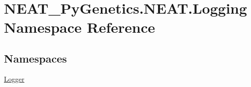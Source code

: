\hypertarget{namespaceNEAT__PyGenetics_1_1NEAT_1_1Logging}{}\section{N\+E\+A\+T\+\_\+\+Py\+Genetics.\+N\+E\+A\+T.\+Logging Namespace Reference}
\label{namespaceNEAT__PyGenetics_1_1NEAT_1_1Logging}
\subsection*{Namespaces}
\begin{DoxyCompactItemize}
\item 
 \hyperlink{namespaceNEAT__PyGenetics_1_1NEAT_1_1Logging_1_1Logger}{Logger}
\end{DoxyCompactItemize}
